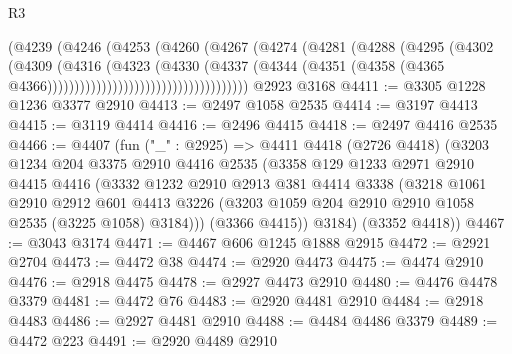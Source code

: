 \begin{lexlean}{R3}
\begin{coremodule}
                                        (@4239
                                          (@4246
                                            (@4253
                                              (@4260
                                                (@4267
                                                  (@4274
                                                    (@4281
                                                      (@4288
                                                        (@4295
                                                          (@4302
                                                            (@4309
                                                              (@4316
                                                                (@4323
                                                                  (@4330
                                                                    (@4337
                                                                      (@4344
                                                                        (@4351
                                                                          (@4358
                                                                            (@4365
                                                                              @4366)))))))))))))))))))))))))))))))))))))
    @2923
    @3168
@4411 := @3305 @1228 @1236 @3377 @2910
@4413 := @2497 @1058 @2535
@4414 := @3197 @4413
@4415 := @3119 @4414
@4416 := @2496 @4415
@4418 := @2497 @4416 @2535
@4466 := @4407
    (fun ("_" : @2925) =>
    @4411
      @4418
      (@2726 @4418)
      (@3203
        @1234
        @204
        @3375
        @2910
        @4416
        @2535
        (@3358
          @129
          @1233
          @2971
          @2910
          @4415
          @4416
          (@3332
            @1232
            @2910
            @2913
            @381
            @4414
            @3338
            (@3218
              @1061
              @2910
              @2912
              @601
              @4413
              @3226
              (@3203 @1059 @204 @2910 @2910 @1058 @2535 (@3225 @1058) @3184)))
          (@3366 @4415))
        @3184)
      (@3352 @4418))
@4467 := @3043 @3174
@4471 := @4467 @606 @1245 @1888 @2915
@4472 := @2921 @2704
@4473 := @4472 @38
@4474 := @2920 @4473
@4475 := @4474 @2910
@4476 := @2918 @4475
@4478 := @2927 @4473 @2910
@4480 := @4476 @4478 @3379
@4481 := @4472 @76
@4483 := @2920 @4481 @2910
@4484 := @2918 @4483
@4486 := @2927 @4481 @2910
@4488 := @4484 @4486 @3379
@4489 := @4472 @223
@4491 := @2920 @4489 @2910

\end{coremodule}
\end{lexlean}
